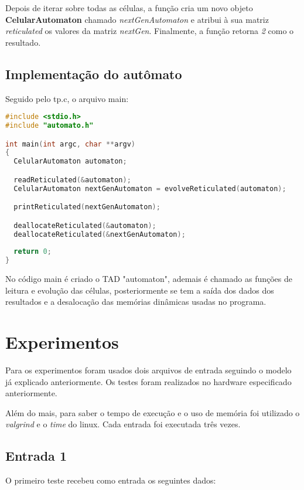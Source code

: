 \documentclass{article}
\begin{document}
Depois de iterar sobre todas as células, a função cria um novo objeto \textbf{CelularAutomaton} chamado \textit{nextGenAutomaton} e atribui à sua matriz \textit{reticulated} os valores da matriz \textit{nextGen}. Finalmente, a função retorna \textit{2} como o resultado.

\clearpage
 
 \subsection{Implementação do autômato}
\noindent Seguido pelo tp.c, o arquivo main:

\begin{lstlisting}[caption={Função main.},label={lst:cod4},language=C]
#include <stdio.h>
#include "automato.h"

int main(int argc, char **argv) 
{
  CelularAutomaton automaton;

  readReticulated(&automaton);
  CelularAutomaton nextGenAutomaton = evolveReticulated(automaton);

  printReticulated(nextGenAutomaton);

  deallocateReticulated(&automaton);
  deallocateReticulated(&nextGenAutomaton);
  
  return 0;
}
 \end{lstlisting}
 \hfill\break
 
 No código main é criado o TAD "automaton", ademais é chamado as funções de leitura e evolução das células, posteriormente se tem a saída dos dados dos resultados e a desalocação das memórias dinâmicas usadas no programa.
 
 \clearpage
\section{Experimentos}
\DESCRICAO{}

Para os experimentos foram usados dois arquivos de entrada seguindo o modelo já explicado anteriormente. Os testes foram realizados no hardware especificado anteriormente.
 
Além do mais, para saber o tempo de execução e o uso de memória foi utilizado o \textit{valgrind} e o \textit{time} do linux. Cada entrada foi executada três vezes.

\subsection{Entrada 1}
\noindent O primeiro teste recebeu como entrada os seguintes dados: 
\end{document}
